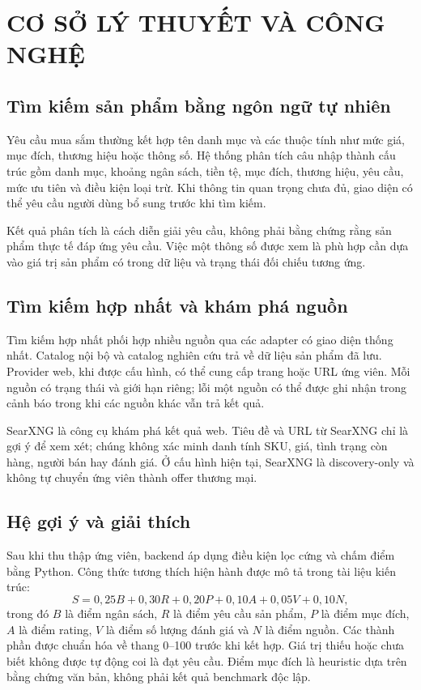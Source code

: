 \chapter{CƠ SỞ LÝ THUYẾT VÀ CÔNG NGHỆ}

\section{Tìm kiếm sản phẩm bằng ngôn ngữ tự nhiên}

Yêu cầu mua sắm thường kết hợp tên danh mục và các thuộc tính như mức giá, mục đích, thương hiệu hoặc thông số. Hệ thống phân tích câu nhập thành cấu trúc gồm danh mục, khoảng ngân sách, tiền tệ, mục đích, thương hiệu, yêu cầu, mức ưu tiên và điều kiện loại trừ. Khi thông tin quan trọng chưa đủ, giao diện có thể yêu cầu người dùng bổ sung trước khi tìm kiếm.

Kết quả phân tích là cách diễn giải yêu cầu, không phải bằng chứng rằng sản phẩm thực tế đáp ứng yêu cầu. Việc một thông số được xem là phù hợp cần dựa vào giá trị sản phẩm có trong dữ liệu và trạng thái đối chiếu tương ứng.

\section{Tìm kiếm hợp nhất và khám phá nguồn}

Tìm kiếm hợp nhất phối hợp nhiều nguồn qua các adapter có giao diện thống nhất. Catalog nội bộ và catalog nghiên cứu trả về dữ liệu sản phẩm đã lưu. Provider web, khi được cấu hình, có thể cung cấp trang hoặc URL ứng viên. Mỗi nguồn có trạng thái và giới hạn riêng; lỗi một nguồn có thể được ghi nhận trong cảnh báo trong khi các nguồn khác vẫn trả kết quả.

SearXNG là công cụ khám phá kết quả web. Tiêu đề và URL từ SearXNG chỉ là gợi ý để xem xét; chúng không xác minh danh tính SKU, giá, tình trạng còn hàng, người bán hay đánh giá. Ở cấu hình hiện tại, SearXNG là discovery-only và không tự chuyển ứng viên thành offer thương mại.

\section{Hệ gợi ý và giải thích}

Sau khi thu thập ứng viên, backend áp dụng điều kiện lọc cứng và chấm điểm bằng Python. Công thức tương thích hiện hành được mô tả trong tài liệu kiến trúc:
\begin{equation}
 S = 0{,}25B + 0{,}30R + 0{,}20P + 0{,}10A + 0{,}05V + 0{,}10N,
\end{equation}
trong đó $B$ là điểm ngân sách, $R$ là điểm yêu cầu sản phẩm, $P$ là điểm mục đích, $A$ là điểm rating, $V$ là điểm số lượng đánh giá và $N$ là điểm nguồn. Các thành phần được chuẩn hóa về thang 0--100 trước khi kết hợp. Giá trị thiếu hoặc chưa biết không được tự động coi là đạt yêu cầu. Điểm mục đích là heuristic dựa trên bằng chứng văn bản, không phải kết quả benchmark độc lập.

